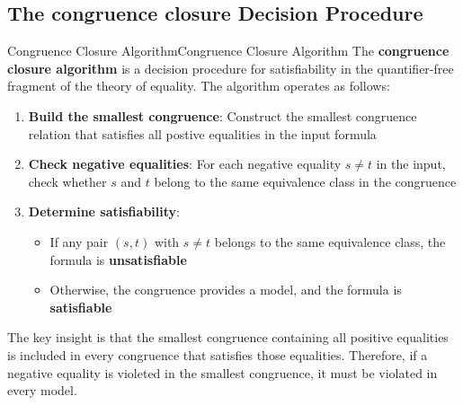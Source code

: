 \documentclass[a4paper]{article}
\theoremstyle{definition}
\begin{document}
\subsection{The congruence closure Decision Procedure}
\begin{definition}{Congruence Closure Algorithm}{Congruence Closure Algorithm}
The \textbf{congruence closure algorithm} is a decision procedure for satisfiability in the quantifier-free fragment 
of the theory of equality. The algorithm operates as follows:
\begin{enumerate}
	\item \textbf{Build the smallest congruence}: Construct the smallest congruence relation that satisfies all postive equalities in the input formula 
	\item \textbf{Check negative equalities}: For each negative equality \( s \neq t \) in the input, check whether \( s \) and \( t \) belong to the same equivalence class in the congruence
	\item \textbf{Determine satisfiability}:
	\begin{itemize}
		\item If any pair \( (s,t) \) with \( s \neq t \) belongs to the same equivalence class, the formula is \textbf{unsatisfiable}
		\item Otherwise, the congruence provides a model, and the formula is \textbf{satisfiable}
	\end{itemize}
\end{enumerate}
\end{definition}
The key insight is that the smallest congruence containing all positive equalities is included in every congruence 
that satisfies those equalities. Therefore, if a negative equality is violeted in the smallest congruence, it must be violated in 
every model.
\end{document}
